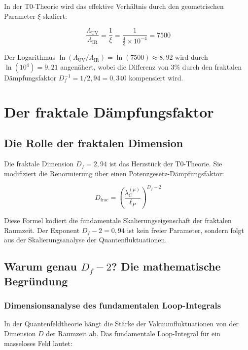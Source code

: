 \documentclass[12pt,a4paper]{article}
\theoremstyle{definition}
\begin{document}
	In der T0-Theorie wird das effektive Verhältnis durch den geometrischen Parameter $\xi$ skaliert:
	
	\begin{equation}
		\frac{\Lambda_{\mathrm{UV}}}{\Lambda_{\mathrm{IR}}} = \frac{1}{\xi} = \frac{1}{\frac{4}{3} \times 10^{-4}} = 7500
	\end{equation}
	
	Der Logarithmus $\ln(\Lambda_{\mathrm{UV}}/\Lambda_{\mathrm{IR}}) = \ln(7500) \approx 8{,}92$ wird durch $\ln(10^4) = 9{,}21$ angenähert, wobei die Differenz von 3\% durch den fraktalen Dämpfungsfaktor $D_f^{-1} = 1/2{,}94 = 0{,}340$ kompensiert wird.
	
	\section{Der fraktale Dämpfungsfaktor}
	
	\subsection{Die Rolle der fraktalen Dimension}
	
	Die fraktale Dimension $D_f = 2{,}94$ ist das Herzstück der T0-Theorie. Sie modifiziert die Renormierung über einen Potenzgesetz-Dämpfungsfaktor:
	
	\begin{equation}
		D_{\text{frac}} = \left(\frac{\lambda_C^{(\mu)}}{\ell_P}\right)^{D_f - 2}
	\end{equation}
	
	Diese Formel kodiert die fundamentale Skalierungseigenschaft der fraktalen Raumzeit. Der Exponent $D_f - 2 = 0{,}94$ ist kein freier Parameter, sondern folgt aus der Skalierungsanalyse der Quantenfluktuationen.
	
	\subsection{Warum genau $D_f - 2$? Die mathematische Begründung}
	
	\subsubsection{Dimensionsanalyse des fundamentalen Loop-Integrals}
	
	In der Quantenfeldtheorie hängt die Stärke der Vakuumfluktuationen von der Dimension $D$ der Raumzeit ab. Das fundamentale Loop-Integral für ein masseloses Feld lautet:
	
\end{document}
